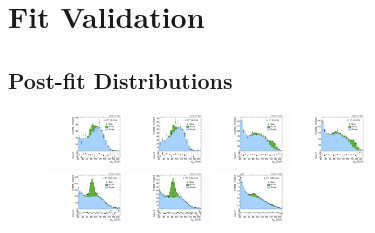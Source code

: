 \section{Fit Validation}

\subsection{Post-fit Distributions}

\begin{figure}[htbp]
  \centering
  \includegraphics[width=0.18\textwidth]{fig/analysisAppendix/PostFit_SR_MJJ__mu_HP_bb_LDy_Run2.pdf}
  \includegraphics[width=0.18\textwidth]{fig/analysisAppendix/PostFit_SR_MJJ__e_HP_bb_LDy_Run2.pdf}
  \includegraphics[width=0.18\textwidth]{fig/analysisAppendix/PostFit_SR_MJJ__mu_LP_bb_LDy_Run2.pdf}
  \includegraphics[width=0.18\textwidth]{fig/analysisAppendix/PostFit_SR_MJJ__e_LP_bb_LDy_Run2.pdf}\\
  \includegraphics[width=0.18\textwidth]{fig/analysisAppendix/PostFit_SR_MJJ__mu_HP_nobb_LDy_Run2.pdf}
  \includegraphics[width=0.18\textwidth]{fig/analysisAppendix/PostFit_SR_MJJ__e_HP_nobb_LDy_Run2.pdf}
  \includegraphics[width=0.18\textwidth]{fig/analysisAppendix/PostFit_SR_MJJ__mu_LP_nobb_LDy_Run2.pdf}

\end{figure}
